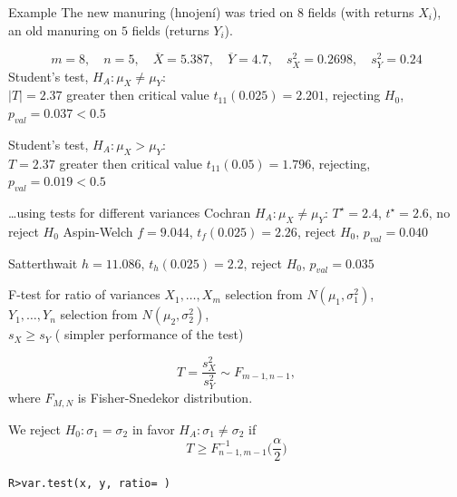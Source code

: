 \documentclass[smaller]{beamer}
\def\abs#1{\lvert#1\rvert}
\def\ol#1{\overline{#1}}
\def\xskip{{\vspace{2ex}}}
\def\cz#1{{\small (#1)}}
\begin{document}
\begin{frame}{Example}
The new manuring \cz{hnojení} was tried on $8$ fields (with returns $X_i$),\\ 
an old manuring on $5$ fields (returns $Y_i$).

\[
 m=8,\quad n=5,\quad \ol{X}=5.387,\quad \ol{Y}=4.7,\quad s_X^2=0.2698,\quad s_Y^2=0.24
\]
Student's test, $H_A: \mu_X\ne \mu_Y$: \\
$\abs{T}=2.37$ greater then critical value $t_{11}(0.025) =2.201$, rejecting $H_0$, $p_{val} = 0.037 < 0.5$

\xskip
Student's test,  $H_A: \mu_X > \mu_Y$: \\
$T=2.37$ greater then critical value $t_{11}(0.05) =1.796$, rejecting, $p_{val} = 0.019 < 0.5$
\end{frame}

\begin{frame}{\dots using tests for different variances}
Cochran $H_A:  \mu_X\ne \mu_Y$:
$T^{\star} = 2.4$, $t^{\star} = 2.6$, no reject $H_0$
\xskip
Aspin-Welch $f=9.044$, $t_f(0.025) = 2.26$, reject $H_0$, $p_{val} = 0.040$

\xskip
Satterthwait $h=11.086$, $t_h(0.025) =2.2$, reject $H_0$, $p_{val} = 0.035$

\end{frame}




\begin{frame}[fragile]{F-test for ratio of variances }
$X_1, \dots ,X_m$ selection from $N(\mu_1,\sigma_1^2)$,\\
$Y_1, \dots ,Y_n$ selection from  $N(\mu_2,\sigma_2^2)$,\\
$s_X \ge s_Y$ ( simpler performance of the test)

\[
  T=\frac{s_X^2}{s_Y^2} \sim F_{m-1,n-1},
\]
where $F_{M,N}$ is  Fisher-Snedekor distribution.

We reject $H_0:\sigma_1 = \sigma_2$ in favor  $H_A: \sigma_1\ne\sigma_2$ if 
\[
  T \ge F^{-1}_{n-1,m-1}\Big(\frac{\alpha}{2}\Big)
\]

\verb'R>var.test(x, y, ratio= )'
\end{frame}
\end{document}
